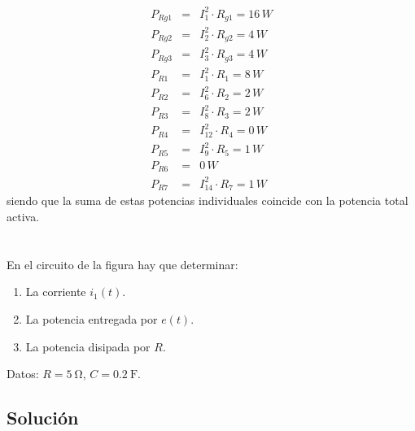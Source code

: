 \documentclass[10pt]{article}
\begin{document}
\begin{eqnarray*}
P_{Rg1} & = & I_{1}^{2}\cdot R_{g1}=16\, W\\
P_{Rg2} & = & I_{2}^{2}\cdot R_{g2}=4\, W\\
P_{Rg3} & = & I_{3}^{2}\cdot R_{g3}=4\, W\\
P_{R1} & = & I_{1}^{2}\cdot R_{1}=8\, W\\
P_{R2} & = & I_{6}^{2}\cdot R_{2}=2\, W\\
P_{R3} & = & I_{8}^{2}\cdot R_{3}=2\, W\\
P_{R4} & = & I_{12}^{2}\cdot R_{4}=0\, W\\
P_{R5} & = & I_{9}^{2}\cdot R_{5}=1\, W\\
P_{R6} & = & 0\, W\\
P_{R7} & = & I_{14}^{2}\cdot R_{7}=1\, W
\end{eqnarray*}
siendo que la suma de estas potencias individuales coincide con la
potencia total activa.

\clearpage

\section{}

En el circuito de la figura hay que determinar:

\begin{enumerate}
\item La corriente $i_1(t)$.
\item La potencia entregada por $e(t)$.
\item La potencia disipada por $R$.
\end{enumerate}

Datos: $R = \SI{5}{\ohm}$, $C = \SI{0.2}{\farad}$.

\subsection*{Solución}
\end{document}
